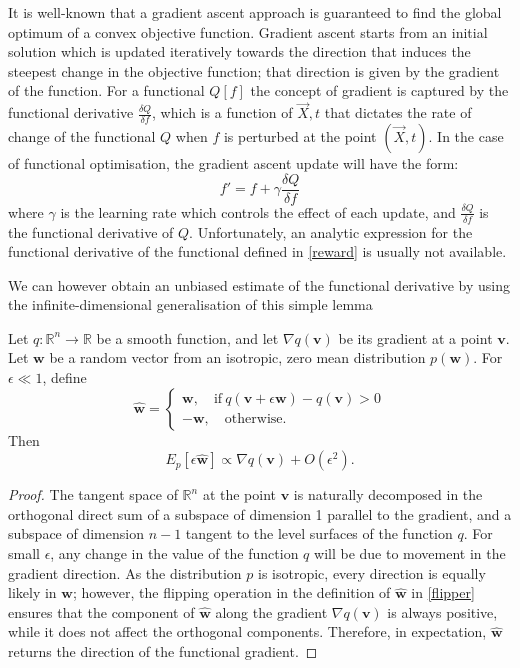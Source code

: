 It is well-known that a gradient ascent approach is guaranteed to find the global optimum of a convex objective function.
Gradient ascent starts from an initial solution which is updated iteratively towards the direction that induces the steepest change in the objective function; that direction is given by the gradient of the function.
For a functional $Q[f]$ the concept of gradient is captured by the functional derivative $\frac{\delta Q}{\delta f}$, which is a function of $\vec{X}, t$ that dictates the rate of change of the functional $Q$ when $f$ is perturbed at the point $(\vec{X}, t)$.
In the case of functional optimisation, the gradient ascent update will have the form:
\begin{equation}
f' = f + \gamma \frac{\delta Q}{\delta f}
\end{equation}
where $\gamma$ is the learning rate which controls the effect of each update, and $\frac{\delta Q}{\delta f}$ is the functional derivative of $Q$. Unfortunately, an analytic expression for the functional derivative of the functional defined in \eqref{reward} is usually not available.

We can however obtain an unbiased estimate of the functional derivative by using the infinite-dimensional generalisation of this simple lemma
\begin{lemma}\label{finDimGrad}
Let $q\colon\mathbb{R}^n\rightarrow\mathbb{R}$ be a smooth function, and let $\nabla q(\mathbf{v})$ be its gradient at a point $\mathbf{v}$. 
Let $\mathbf{w}$ be a random vector from an isotropic, zero mean distribution $p(\mathbf{w})$. 
For $\epsilon\ll 1$, define  \begin{equation}
\hat{\mathbf{w}}= 
\begin{cases}
\mathbf{w}, \quad  \mathrm{if\ } q(\mathbf{v}+\epsilon\mathbf{w}) - q(\mathbf{v}) > 0 \\
-\mathbf{w}, \quad \mathrm{otherwise}.
\end{cases}\label{flipper}
\end{equation}
Then\[
E_p\left[\epsilon\hat{\mathbf{w}}\right]\propto\nabla q(\mathbf{v})+O(\epsilon^2).\]
\end{lemma}
\begin{proof}
The tangent space of $\mathbb{R}^n$ at the point $\mathbf{v}$ is naturally decomposed in the orthogonal direct sum of a subspace of dimension 1 parallel to the gradient, and a subspace of dimension $n-1$ tangent to the level surfaces of the function $q$. 
For small $\epsilon$, any change in the value of the function $q$ will be due to movement in the gradient direction. 
As the distribution $p$ is isotropic, every direction is equally likely in $\mathbf{w}$; however, the flipping operation in the definition of $\hat{\mathbf{w}}$ in \eqref{flipper} ensures that the component of $\hat{\mathbf{w}}$ along the gradient $\nabla q(\mathbf{v})$ is always positive, while it does not affect the orthogonal components. 
Therefore, in expectation, $\hat{\mathbf{w}}$ returns the direction of the functional gradient.
\end{proof}



